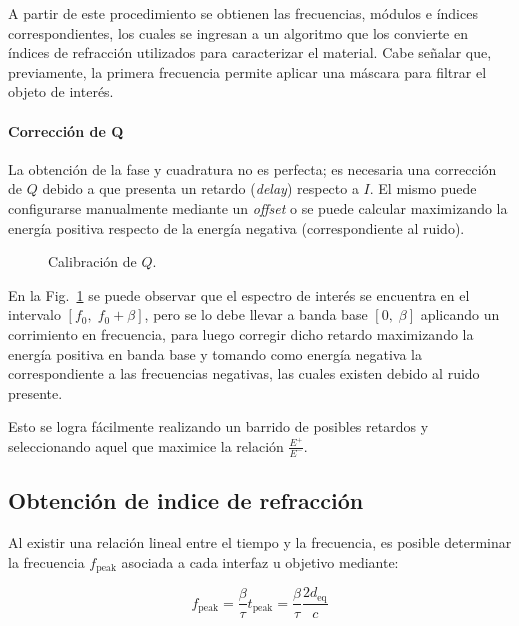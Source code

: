 A partir de este procedimiento se obtienen las frecuencias, módulos e índices correspondientes, los cuales se ingresan a un algoritmo que los convierte en índices de refracción utilizados para caracterizar el material. Cabe señalar que, previamente, la primera frecuencia permite aplicar una máscara para filtrar el objeto de interés.
\paragraph{Corrección de \textbf{Q}}

La obtención de la fase y cuadratura no es perfecta; es necesaria una corrección de \(Q\) debido a que presenta un retardo (\textit{delay}) respecto a \(I\). El mismo puede configurarse manualmente mediante un \textit{offset} o se puede calcular maximizando la energía positiva respecto de la energía negativa (correspondiente al ruido).

\begin{figure}[H]
    \centering
    \resizebox{0.8\textwidth}{!}{%
    }
    \caption{Calibración de \(Q\).}
    \label{fig:cal_Q}
\end{figure}

En la Fig.~\ref{fig:cal_Q} se puede observar que el espectro de interés se encuentra en el intervalo \([f_0,\; f_0+\beta]\), pero se lo debe llevar a banda base \([0,\; \beta]\) aplicando un corrimiento en frecuencia, para luego corregir dicho retardo maximizando la energía positiva en banda base y tomando como energía negativa la correspondiente a las frecuencias negativas, las cuales existen debido al ruido presente.

Esto se logra fácilmente realizando un barrido de posibles retardos y seleccionando aquel que maximice la relación \(\frac{E^{+}}{E^{-}}\).


\subsection{Obtención de indice de refracción}

Al existir una relación lineal entre el tiempo y la frecuencia, es posible determinar la frecuencia $f_{\text{peak}}$ asociada a cada interfaz u objetivo mediante:

\begin{equation}
    f_{\text{peak}} = \frac{\beta}{\tau} t_{\text{peak}} = \frac{\beta}{\tau} \frac{2d_{\text{eq}}}{c}
\end{equation}

